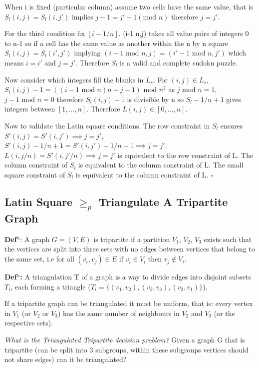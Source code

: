 \documentclass[a4paper,11pt]{report}
\newcounter{row}
\newcounter{col}
\begin{document}
When i is fixed (particular column) assume two cells have the same value, that is $S_l(i,j)=S_l(i,j')$ implies $j-1=j'-1 (\text{mod }n)$ therefore $j=j'$.

For the third condition fix $\left\lfloor{i-1/n}\right\rfloor$. (i-1  n,j) takes all value pairs of integers 0 to n-1 so if a cell has the same value as another within the n by n square $S_l(i,j)=S_l(i',j')$ implying $(i-1 \text{ mod }n,j)=(i'-1 \text{ mod } n,j')$ which means $i=i'$ and $j=j'$. Therefore $S_l$ is a valid and complete sudoku puzzle.

Now consider which integers fill the blanks in $L_s$. For $(i,j)\in L_s$, $S_l(i,j)-1= ((i-1 \text{ mod } n)n+j-1)\text{ mod } n^2$ as $j \text{ mod } n=1$, $j-1\text{ mod }n=0$ therefore $S_l(i,j)-1$ is divisible by n so $S_l-1/n+1$ gives integers between $[1,...,n]$.
Therefore $L(i,j) \in [0,...,n]$.

Now to validate the Latin square conditions. The row constraint in $S_l$ ensures $S'(i,j)=S'(i,j') \implies j=j'$, $S'(i,j)-1/n+1=S'(i,j')-1/n+1 \implies j=j'$, $L(i,j/n)=S'(i,j'/n) \implies j=j'$ is equivalent to the row constraint of L. The column constraint of $S_l$ is equivalent to the column constraint of L. The small square constraint of $S_l$ is equivalent to the column constraint of L. $\square$

\subsection{Latin Square $\geq_p$ Triangulate A Tripartite Graph}

\textbf{Def$^n$}: A graph $G=(V,E)$ is tripartite if a partition $V_1$, $V_2$, $V_3$ exists such that the vertices are split into three sets with no edges between vertices that belong to the same set, i.e for all $(v_i,v_j) \in E\text{ if } v_i \in V_i\text{ then }v_j \not\in V_i $.

\textbf{Def$^n$:} A triangulation T of a graph is a way to divide edges into disjoint subsets $T_i$, each forming a triangle ($T_i=\{(v_{1}, v_{2}),(v_{2}, v_{3}),(v_{3},v_{1})\}$).

If a tripartite graph can be triangulated it must be uniform, that is: every vertex in $V_1$ (or $V_2$ or $V_3$) has the same number of neighbours in $V_2$ and $V_3$ (or the respective sets).

\textit{What is the Triangulated Tripartite decision problem?} Given a graph G that is tripartite (can be split into 3 subgroups, within these subgroups vertices should not share edges) can it be triangulated?
\end{document}
